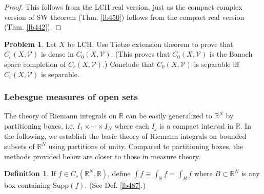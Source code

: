 \documentclass[12pt,b5paper,notitlepage]{article}
\theoremstyle{definition}
\newtheorem{df}{Definition}[section]
\newtheorem{prob}{\color{red}Problem}[section]
\theoremstyle{plain}
\newcommand{\mc}{\mathcal}
\newcommand{\Rbb}{\mathbb R}
\newcommand{\Supp}{\mathrm{Supp}}
\newcommand{\dps}{\displaystyle}
\numberwithin{equation}{section}
\begin{document}
\begin{proof}
This follows from the LCH real version, just as the compact complex version of SW theorem (Thm. \ref{lb450}) follows from the compact real version (Thm. \ref{lb442}).
\end{proof}





\begin{prob}\label{lb485}
Let $X$ be LCH. Use Tietze extension theorem to prove that $C_c(X,\mc V)$ is dense in $C_0(X,\mc V)$. (This proves that $C_0(X,\mc V)$ is the Banach space completion of $C_c(X,\mc V)$.) Conclude that $C_0(X,\mc V)$ is separable iff $C_c(X,\mc V)$ is separable.
\end{prob}


\subsubsection{Lebesgue measures of open sets}\label{lb494}


The theory of Riemann integrals on $\Rbb$ can be easily generalized to $\Rbb^N$ by partitioning boxes, i.e. $I_1\times\cdots\times I_N$ where each $I_j$ is a compact interval in $\Rbb$. In the following, we establish the basic theory of Riemann integrals on bounded subsets of $\Rbb^N$ using partitions of unity. Compared to partitioning boxes, the methods provided below are closer to those in measure theory.

\begin{df}
If $f\in C_c(\Rbb^N,\Rbb)$, define $\dps\int f\equiv\int_\Rbb f=\int_Bf$ where $B\subset\Rbb^N$ is any box containing $\Supp(f)$. (See Def. \ref{lb487}.)
\end{df}
\end{document}
